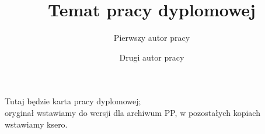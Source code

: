 \documentclass[polish,bachelor,a4paper,oneside]{putthesis}
\author{%
   Pierwszy autor pracy \album{nr-indeksu} \and 
   Drugi autor pracy \album{nr-indeksu}}
\title{Temat pracy dyplomowej}
\begin{document}
\frontmatter\pagestyle{empty}%
\maketitle\cleardoublepage%


\thispagestyle{empty}\vspace*{\fill}%
\begin{center}Tutaj będzie karta pracy dyplomowej;\\oryginał wstawiamy do wersji dla archiwum PP, w pozostałych kopiach wstawiamy ksero.\end{center}%
\vfill\cleardoublepage%


\pagestyle{putthesis}%
\tableofcontents* 
\cleardoublepage %


\mainmatter%






{\raggedright\sloppy\small}


\cleardoublepage\appendix%
\newpage



\ppcolophon
\end{document}
